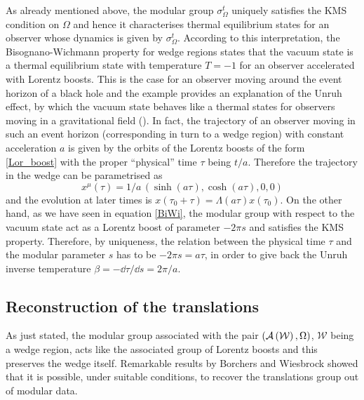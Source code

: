  \medskip
 As already mentioned above, the modular group $\sigma^t_{\Omega}$ 
 uniquely satisfies  the \ac{KMS} condition on $\Omega$ and hence
 it characterises thermal equilibrium states for an observer whose
 dynamics is given by $\sigma^t_{\Omega}$. According to this 
 interpretation, the Bisognano-Wichmann property for wedge regions 
 states that the vacuum state is a thermal equilibrium state with 
 temperature $T=-1$ for an observer accelerated with Lorentz boosts.
 This is the case for an observer moving around the event horizon
 of a black hole and the example provides an explanation of the
 Unruh effect, by which the vacuum state
 behaves like a thermal states for observers moving in a 
 gravitational field (\cite{ConRov:1994, MartRov:2003}). 
 In fact, the trajectory of an observer moving in such 
 an event horizon (corresponding in turn to a wedge region) 
 with constant acceleration $a$ is given by the orbits of the 
 Lorentz boosts of the form \eqref{Lor_boost} with the 
 proper ``physical'' time $\tau$ being $t/a$. 
 Therefore the trajectory in the wedge can be
 parametrised as 
 \[
 x^{\mu}(\tau)=1/a\,(\sinh(a\tau),\cosh(a\tau),0,0)
 \]
 and the evolution at later times is $x(\tau_0+\tau)=
 \Lambda(a\tau)x(\tau_0)$. On the other hand, as we 
 have seen in equation \eqref{BiWi}, the modular group 
 with respect to the vacuum state act as a Lorentz boost
 of parameter $-2\pi s$ and satisfies the \ac{KMS} 
 property. Therefore, by uniqueness, the relation between
 the physical time $\tau$ and the modular parameter $s$
 has to be $-2\pi s=a\tau$, in order to give back 
 the Unruh inverse temperature $\beta=-\dd \tau/\dd s=2\pi/a$.
 
 \subsection{Reconstruction of the translations}
 \label{Reconstruction of the translations}
 As just stated, the modular group associated with the pair
 $(\mathcal{A}\left(\mathcal{W}\right),\Omega)$, $\mathcal{W}$ being a wedge region,
 acts like the associated group of Lorentz boosts and this 
 preserves the wedge itself. Remarkable results by Borchers 
 \cite*{Borch:1992} and Wiesbrock \cite*{Wies1,Wies2,Wies3}
 showed that it is possible, under suitable conditions, to
 recover the translations group out of modular data.
 
